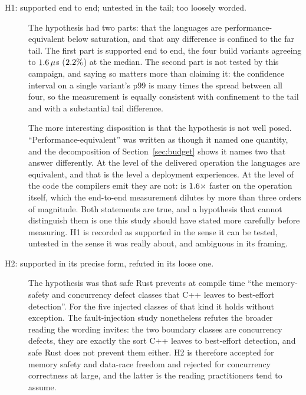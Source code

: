 \documentclass[english,twoside,openright,a4paper,censored,csm,software-track-2020]{HYthesisML}
\begin{document}
\begin{description}
  \item[H1: supported end to end; untested in the tail; too loosely worded.]
        The hypothesis had two parts: that the languages are performance-equivalent
        below saturation, and that any difference is confined to the far tail. The first part
        is supported end to end, the four build variants agreeing to $1.6\,\mu$s
        ($2.2\%$) at the median. The second part is not tested by this campaign, and
        saying so matters more than claiming it: the confidence interval on a single variant's
        p99 is many times the spread between all four, so the measurement is equally
        consistent with confinement to the tail and with a substantial tail difference.

        The more interesting disposition is that the hypothesis is not well posed.
        ``Performance-equivalent'' was written as though it named one quantity, and the
        decomposition of Section~\ref{sec:budget} shows it names two that answer differently.
        At the level of the delivered operation the languages are equivalent, and that is the
        level a deployment experiences. At the level of the code the compilers emit they are
        not: \BudgetCoreFaster{} is $1.6\times$ faster on the operation itself,
        which the end-to-end measurement dilutes by more than three orders of magnitude. Both
        statements are true, and a hypothesis that cannot distinguish them is one this study
        should have stated more carefully before measuring. H1 is recorded as supported in the
        sense it can be tested, untested in the sense it was really about, and ambiguous in
        its framing.
  \item[H2: supported in its precise form, refuted in its loose one.] The hypothesis was
        that safe Rust prevents at compile time ``the memory-safety and concurrency defect
        classes that C++ leaves to best-effort detection''. For the five injected classes of
        that kind it holds without exception. The fault-injection study nonetheless refutes
        the broader reading the wording invites: the two boundary classes are concurrency
        defects, they are exactly the sort C++ leaves to best-effort detection, and safe Rust
        does not prevent them either. H2 is therefore accepted for memory safety and
        data-race freedom and rejected for concurrency correctness at large, and the latter is
        the reading practitioners tend to assume.

\end{description}
\end{document}
